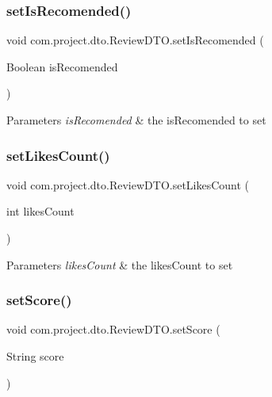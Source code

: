 \subsubsection{set\+Is\+Recomended()}
{\footnotesize\ttfamily void com.\+project.\+dto.\+Review\+D\+T\+O.\+set\+Is\+Recomended (\begin{DoxyParamCaption}\item[{Boolean}]{is\+Recomended }\end{DoxyParamCaption})}


\begin{DoxyParams}{Parameters}
{\em is\+Recomended} & the is\+Recomended to set \\
\hline
\end{DoxyParams}
\mbox{\label{classcom_1_1project_1_1dto_1_1_review_d_t_o_a8b794c0b7c71802b410d4ea881a7b58c}} 
\subsubsection{set\+Likes\+Count()}
{\footnotesize\ttfamily void com.\+project.\+dto.\+Review\+D\+T\+O.\+set\+Likes\+Count (\begin{DoxyParamCaption}\item[{int}]{likes\+Count }\end{DoxyParamCaption})}


\begin{DoxyParams}{Parameters}
{\em likes\+Count} & the likes\+Count to set \\
\hline
\end{DoxyParams}
\mbox{\label{classcom_1_1project_1_1dto_1_1_review_d_t_o_ac5cab37e8ef89a1820fd649cdc5344e8}} 
\subsubsection{set\+Score()}
{\footnotesize\ttfamily void com.\+project.\+dto.\+Review\+D\+T\+O.\+set\+Score (\begin{DoxyParamCaption}\item[{String}]{score }\end{DoxyParamCaption})}


